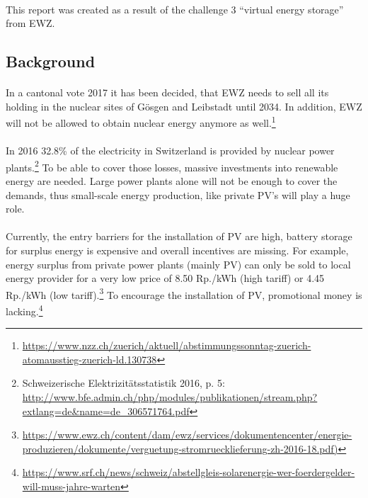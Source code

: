 \documentclass{scrartcl}
\begin{document}
	\paragraph{}
	This report was created as a result of the challenge 3 “virtual energy storage” from EWZ.
	
	\subsection{Background}
	
	\paragraph{}
	In a cantonal vote 2017 it has been decided, that EWZ needs to sell all its holding in the nuclear sites of Gösgen and Leibstadt until 2034. In addition, EWZ will not be allowed to obtain nuclear energy anymore as well.\footnote{\url{https://www.nzz.ch/zuerich/aktuell/abstimmungssonntag-zuerich-atomausstieg-zuerich-ld.130738}}
	
	\paragraph{}
	In 2016 32.8\% of the electricity in Switzerland is provided by nuclear power plants.\footnote{Schweizerische Elektrizitätsstatistik 2016, p. 5: \url{http://www.bfe.admin.ch/php/modules/publikationen/stream.php?extlang=de\&name=de_306571764.pdf}} To be able to cover those losses, massive investments into renewable energy are needed. Large power plants alone will not be enough to cover the demands, thus small-scale energy production, like private PV's will play a huge role.
	
	\paragraph{}
	Currently, the entry barriers for the installation of PV are high, battery storage for surplus energy is expensive and overall incentives are missing. For example, energy surplus from private power plants (mainly PV) can only be sold to local energy provider for a very low price of 8.50 Rp./kWh (high tariff) or 4.45 Rp./kWh (low tariff).\footnote{\url{https://www.ewz.ch/content/dam/ewz/services/dokumentencenter/energie-produzieren/dokumente/verguetung-stromruecklieferung-zh-2016-18.pdf)}} To encourage the installation of PV, promotional money is lacking.\footnote{\url{https://www.srf.ch/news/schweiz/abstellgleis-solarenergie-wer-foerdergelder-will-muss-jahre-warten}}
\end{document}
